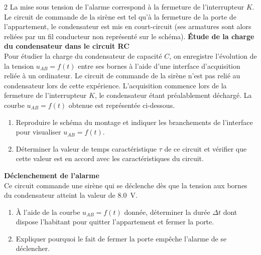 \documentclass[a4paper,11pt,fleqn]{scrartcl}%
\begin{document}
\begin{multicols}{2}
La mise sous tension de l'alarme correspond à la fermeture de l'interrupteur $K$. Le circuit de commande de la sirène est tel qu'à la fermeture de la porte de l'appartement, le condensateur est mis en court-circuit (ses armatures sont alors reliées par un fil conducteur non représenté sur le schéma).
	\textbf{Étude de la charge du condensateur dans le circuit RC}\\
		Pour étudier la charge du condensateur de capacité $C$, on enregistre l'évolution de la tension $u_{AB}=f(t)$ entre ses bornes à l'aide d'une interface d'acquisition reliée à un ordinateur. Le circuit de commande de la sirène n'est pas relié au condensateur lors de cette expérience. L'acquisition commence lors de la fermeture de l'interrupteur $K$, le condensateur étant préalablement déchargé. La courbe $u_{AB}=f(t)$ obtenue est représentée ci-dessous.
	\begin{center}%
	\end{center}
	\begin{enumerate}
		\item Reproduire le schéma du montage et indiquer les branchements de l'interface pour visualiser $u_{AB}=f(t)$.
		\item Déterminer la valeur de temps caractéristique $\tau$ de ce circuit et vérifier que cette valeur est en accord avec les caractéristiques du circuit.
	\end{enumerate}
	\textbf{Déclenchement de l'alarme}\\
	Ce circuit commande une sirène qui se déclenche dès que la tension aux bornes du condensateur atteint la valeur de \SI{8,0}{\volt}.
	\begin{enumerate}
		\item À l'aide de la courbe $u_{AB}=f(t)$ donnée, déterminer la durée $\Delta t$ dont dispose l'habitant pour quitter l'appartement et fermer la porte.
		\item Expliquer pourquoi le fait de fermer la porte empêche l'alarme de se déclencher.
	\end{enumerate}


\end{multicols}
\end{document}

